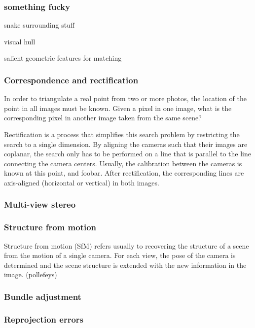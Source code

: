 \subsubsection{something fucky}

snake surrounding stuff

visual hull

salient geometric features for matching

\subsubsection{Correspondence and rectification}

In order to triangulate a real point from two or more photos, the location of the point in all images must be known.
Given a pixel in one image, what is the corresponding pixel in another image taken from the same scene?

Rectification is a process that simplifies this search problem by restricting the search to a single dimension.
By aligning the cameras such that their images are coplanar, the search only has to be performed on a line that is parallel to the line connecting the camera centers.
Usually, the calibration between the cameras is known at this point, and foobar.
After rectification, the corresponding lines are axis-aligned (horizontal or vertical) in both images.



\subsubsection{Multi-view stereo}

\subsubsection{Structure from motion}

Structure from motion (SfM) refers usually to recovering the structure of a scene from the motion of a single camera.
For each view, the pose of the camera is determined and the scene structure is extended with the new information in the image.
(pollefeys)

\subsubsection{Bundle adjustment}

\subsubsection{Reprojection errors}

